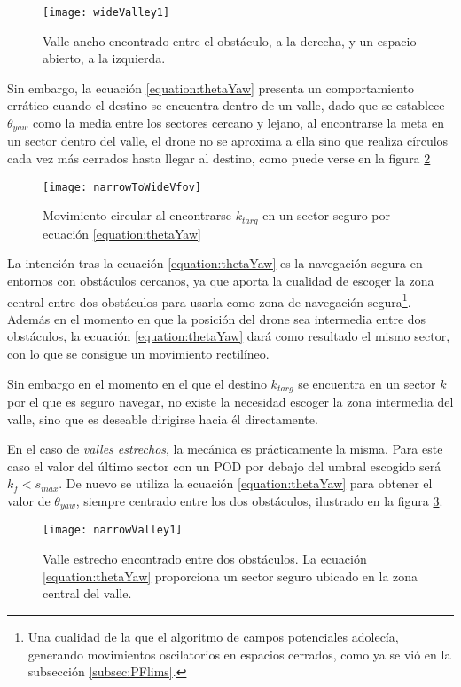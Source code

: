  \begin{figure}[H]
	\centering
	\texttt{[image: wideValley1]}
	\caption[Valles estrechos y anchos.]{Valle ancho encontrado entre el obstáculo, a la derecha, y un espacio abierto, a la izquierda.}\label{fig:wvalley1}
\end{figure}


Sin embargo, la ecuación \ref{equation:thetaYaw} presenta un comportamiento errático cuando el destino se encuentra dentro de un valle, dado que se establece $\theta_{yaw}$ como la media entre los sectores cercano y lejano, al encontrarse la meta en un sector dentro del valle, el drone no se aproxima a ella sino que realiza círculos cada vez más cerrados hasta llegar al destino, como puede verse en la figura \ref{fig:nToWFOV}

 \begin{figure}[H]
	\centering
	\texttt{[image: narrowToWideVfov]}
	\caption[Movimiento circular del agente.]{Movimiento circular al encontrarse $k_{targ}$ en un sector seguro por ecuación \ref{equation:thetaYaw}}\label{fig:nToWFOV}
\end{figure}

La intención tras la ecuación \ref{equation:thetaYaw} es la navegación segura en entornos con obstáculos cercanos, ya que aporta la cualidad de escoger la zona central entre dos obstáculos para usarla como zona de navegación segura\footnote{Una cualidad de la que el algoritmo de campos potenciales adolecía, generando movimientos oscilatorios en espacios cerrados, como ya se vió en la subsección \ref{subsec:PFlims}.}. Además en el momento en que la posición del drone sea intermedia entre dos obstáculos, la ecuación \ref{equation:thetaYaw} dará como resultado el mismo sector, con lo que se consigue un movimiento rectilíneo. 

Sin embargo en el momento en el que el destino $k_{targ}$ se encuentra en un sector $k$ por el que es seguro navegar, no existe la necesidad escoger la zona intermedia del valle, sino que es deseable dirigirse hacia él directamente. 

En el caso de \textit{valles estrechos}, la mecánica es prácticamente la misma. Para este caso el valor del último sector con un POD por debajo del umbral escogido será $k_f < s_{max}$. De nuevo se utiliza la ecuación \ref{equation:thetaYaw} para obtener el valor de $\theta_{yaw}$, siempre centrado entre los dos obstáculos, ilustrado en la figura \ref{fig:nvalley1}.
 \begin{figure}[H]
	\centering
	\texttt{[image: narrowValley1]}
	\caption[Valle estrecho.]{Valle estrecho encontrado entre dos obstáculos. La ecuación \ref{equation:thetaYaw} proporciona un sector seguro ubicado en la zona central del valle.}\label{fig:nvalley1}
\end{figure}

